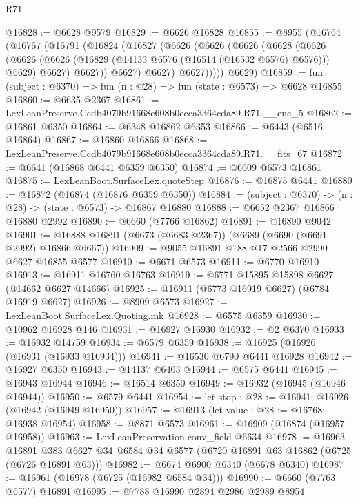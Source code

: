 \begin{lexlean}{R71}
\begin{coremodule}
@16828 := @6628 @9579
@16829 := @6626 @16828
@16855 := @8955
    (@16764
      (@16767
        (@16791
          (@16824
            (@16827
              (@6626
                (@6626
                  (@6626
                    (@6628
                      (@6626
                        (@6626
                          (@6626 (@16829 (@14133 @6576 (@16514 (@16532 @6576) @6576))) @6629)
                          @6627)
                        @6627))
                    @6627)
                  @6627)
                @6627)))))
      @6629)
@16859 := fun (subject : @6370) => fun (n : @28) => fun (state : @6573) => @6628 @16855
@16860 := @6635 @2367
@16861 := LexLeanPreserve.Ccdb4079b91668e608b0ecca3364cda89.R71.__enc_5
@16862 := @16861 @6350
@16864 := @6348 @16862 @6353
@16866 := @6443 (@6516 @16864)
@16867 := @16860 @16866
@16868 := LexLeanPreserve.Ccdb4079b91668e608b0ecca3364cda89.R71.__fits_67
@16872 := @6641 (@16868 @6441 @6359 @6350)
@16874 := @6609 @6573 @16861
@16875 := LexLeanBoot.SurfaceLex.quoteStep
@16876 := @16875 @6441
@16880 := @16872 (@16874 (@16876 @6359 @6350))
@16884 := (subject : @6370) -> (n : @28) -> (state : @6573) -> @16867 @16880
@16888 := @6652 @2367 @16866 @16880 @2992
@16890 := @6660 (@7766 @16862)
@16891 := @16890 @9042
@16901 := @16888 @16891 (@6673 (@6683 @2367)) (@6689 (@6690 (@6691 @2992) @16866 @6667))
@16909 := @9055 @16891 @188 @17 @2566 @2990 @6627 @16855 @6577
@16910 := @6671 @6573
@16911 := @6770 @16910
@16913 := @16911 @16760 @16763
@16919 := @6771 @15895 @15898 @6627 (@14662 @6627 @14666)
@16925 := @16911 (@6773 @16919 @6627) (@6784 @16919 @6627)
@16926 := @8909 @6573
@16927 := LexLeanBoot.SurfaceLex.Quoting.mk
@16928 := @6575 @6359
@16930 := @10962 @16928 @146
@16931 := @16927 @16930
@16932 := @2 @6370
@16933 := @16932 @14759
@16934 := @6579 @6359
@16938 := @16925 (@16926 (@16931 (@16933 @16934)))
@16941 := @16530 @6790 @6441 @16928
@16942 := @16927 @6350
@16943 := @14137 @6403
@16944 := @6575 @6441
@16945 := @16943 @16944
@16946 := @16514 @6350
@16949 := @16932 (@16945 (@16946 @16944))
@16950 := @6579 @6441
@16954 := let stop : @28 := @16941; @16926 (@16942 (@16949 @16950))
@16957 := @16913 (let value : @28 := @16768; @16938 @16954)
@16958 := @8871 @6573
@16961 := @16909 (@16874 (@16957 @16958))
@16963 := LexLeanPreservation.conv_field @6634
@16978 := @16963
    @16891
    @383
    @6627
    @34
    @6584
    @34
    @6577
    (@6720 @16891 @63 @16862 (@6725 (@6726 @16891 @63)))
@16982 := @6674 @6900 @6340 (@6678 @6340)
@16987 := @16961 (@16978 (@6725 (@16982 @6584 @34)))
@16990 := @6660 (@7763 @6577) @16891
@16995 := @7788 @16990 @2894 @2986 @2989 @8954

\end{coremodule}
\end{lexlean}
